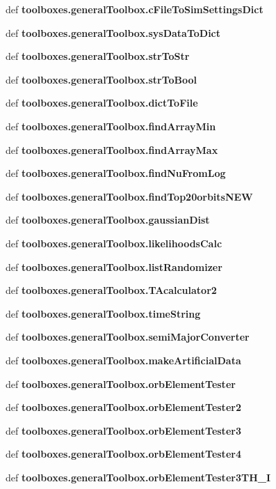 \begin{DoxyCompactItemize}
def {\bf toolboxes.\-general\-Toolbox.\-c\-File\-To\-Sim\-Settings\-Dict}
\item 
def {\bf toolboxes.\-general\-Toolbox.\-sys\-Data\-To\-Dict}
\item 
def {\bf toolboxes.\-general\-Toolbox.\-str\-To\-Str}
\item 
def {\bf toolboxes.\-general\-Toolbox.\-str\-To\-Bool}
\item 
def {\bf toolboxes.\-general\-Toolbox.\-dict\-To\-File}
\item 
def {\bf toolboxes.\-general\-Toolbox.\-find\-Array\-Min}
\item 
def {\bf toolboxes.\-general\-Toolbox.\-find\-Array\-Max}
\item 
def {\bf toolboxes.\-general\-Toolbox.\-find\-Nu\-From\-Log}
\item 
def {\bf toolboxes.\-general\-Toolbox.\-find\-Top20orbits\-N\-E\-W}
\item 
def {\bf toolboxes.\-general\-Toolbox.\-gaussian\-Dist}
\item 
def {\bf toolboxes.\-general\-Toolbox.\-likelihoods\-Calc}
\item 
def {\bf toolboxes.\-general\-Toolbox.\-list\-Randomizer}
\item 
def {\bf toolboxes.\-general\-Toolbox.\-T\-Acalculator2}
\item 
def {\bf toolboxes.\-general\-Toolbox.\-time\-String}
\item 
def {\bf toolboxes.\-general\-Toolbox.\-semi\-Major\-Converter}
\item 
def {\bf toolboxes.\-general\-Toolbox.\-make\-Artificial\-Data}
\item 
def {\bf toolboxes.\-general\-Toolbox.\-orb\-Element\-Tester}
\item 
def {\bf toolboxes.\-general\-Toolbox.\-orb\-Element\-Tester2}
\item 
def {\bf toolboxes.\-general\-Toolbox.\-orb\-Element\-Tester3}
\item 
def {\bf toolboxes.\-general\-Toolbox.\-orb\-Element\-Tester4}
\item 
def {\bf toolboxes.\-general\-Toolbox.\-orb\-Element\-Tester3\-T\-H\-\_\-\-I}
\end{DoxyCompactItemize}
